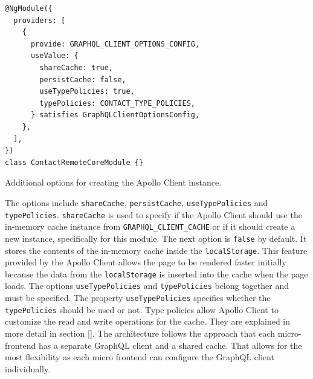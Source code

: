 \ifshowListings
\begin{listing}[H]
\begin{verbatim}
@NgModule({
  providers: [
    {
      provide: GRAPHQL_CLIENT_OPTIONS_CONFIG,
      useValue: {
        shareCache: true,
        persistCache: false,
        useTypePolicies: true,
        typePolicies: CONTACT_TYPE_POLICIES,
      } satisfies GraphQLClientOptionsConfig,
    },
  ],
})
class ContactRemoteCoreModule {}
\end{verbatim}
\caption{Additional options for creating the Apollo Client instance.}\label{code:applied-methods:graphql-client-extra-configuration-options}
\end{listing}
\fi

\noindent The options include \texttt{shareCache}, \texttt{persistCache}, \texttt{useTypePolicies} and \texttt{typePolicies}. \texttt{shareCache} is used to specify if the Apollo Client should use the in-memory cache instance from \texttt{GRAPHQL\_CLIENT\_CACHE} or if it should create a new instance, specifically for this module. The next option is \texttt{false} by default. It stores the contents of the in-memory cache inside the \texttt{localStorage}. This feature provided by the Apollo Client allows the page to be rendered faster initially because the data from the \texttt{localStorage} is inserted into the cache when the page loads. The options \texttt{useTypePolicies} and \texttt{typePolicies} belong together and must be specified. The property \texttt{useTypePolicies} specifies whether the \texttt{typePolicies} should be used or not. Type policies allow Apollo Client to customize the read and write operations for the cache. They are explained in more detail in section \ref{}. The architecture follows the approach that each micro-frontend has a separate GraphQL client and a shared cache. That allows for the most flexibility as each micro frontend can configure the GraphQL client individually.

